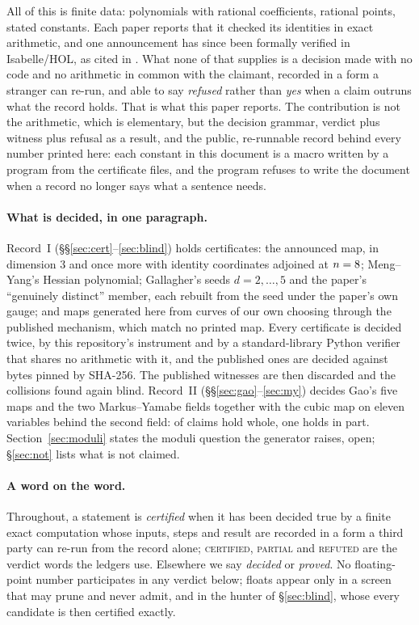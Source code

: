 \documentclass[11pt]{article}
\newcommand{\verdict}[1]{\textsc{#1}}
\begin{document}
All of this is finite data: polynomials with rational coefficients, rational points, stated
constants. Each paper reports that it checked its identities in exact arithmetic, and one
announcement has since been formally verified in Isabelle/HOL, as cited in \cite{CHV2026}
\cite{AFP2026}. What none of that supplies is a decision made with no code and no arithmetic in
common with the claimant, recorded in a form a stranger can re-run, and able to say
\emph{refused} rather than \emph{yes} when a claim outruns what the record holds. That is what
this paper reports. The contribution is not the arithmetic, which is elementary, but the
decision grammar, verdict plus witness plus refusal as a result, and the public, re-runnable
record behind every number printed here: each constant in this document is a macro written by a
program from the certificate files, and the program refuses to write the document when a record
no longer says what a sentence needs.

\paragraph{What is decided, in one paragraph.}
Record~I (\S\S\ref{sec:cert}--\ref{sec:blind}) holds \NCerts{} certificates: the announced map,
in dimension $3$ and once more with identity coordinates adjoined at $n=8$; Meng--Yang's
Hessian polynomial; Gallagher's seeds $d=2,\dots,5$ and the paper's ``genuinely distinct''
member, each rebuilt from the seed under the paper's own gauge; and \NGenerated{} maps generated
here from curves of our own choosing through the published mechanism, which match no printed
map. Every certificate is decided twice, by this repository's instrument and by a standard-library
Python verifier that shares no arithmetic with it, and the \NPublished{} published ones are
decided against bytes pinned by SHA-256. The published witnesses are then discarded and the
collisions found again blind. Record~II (\S\S\ref{sec:gao}--\ref{sec:my}) decides Gao's five maps
and the two Markus--Yamabe fields together with the cubic map on eleven variables behind the
second field: \PolyCertified{} of \PolyRows{} claims hold whole, one holds in part.
Section~\ref{sec:moduli} states the moduli question the generator raises, open;
\S\ref{sec:not} lists what is not claimed.

\paragraph{A word on the word.} Throughout, a statement is \emph{certified} when it has been
decided true by a finite exact computation whose inputs, steps and result are recorded in a form
a third party can re-run from the record alone; \verdict{certified}, \verdict{partial} and
\verdict{refuted} are the verdict words the ledgers use. Elsewhere we say \emph{decided} or
\emph{proved}. No floating-point number participates in any verdict below; floats appear only
in a screen that may prune and never admit, and in the hunter of \S\ref{sec:blind}, whose every
candidate is then certified exactly.
\end{document}
